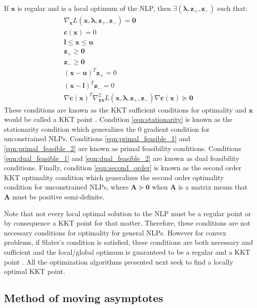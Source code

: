 If $\bm{x}$ is regular and is a local optimum of the NLP, then $\exists (\bm{\lambda}, \bm{z}_+, \bm{z}_-)$ such that:
\begin{align}
  \nabla_{\bm{x}} L(\bm{x}, \bm{\lambda}, \bm{z}_+, \bm{z}_-) = \bm{0} \label{eqn:stationarity} \\
  \bm{c}(\bm{x}) = 0  \label{eqn:primal_feasible_1} \\
  \bm{l} \leq \bm{x} \leq \bm{u}  \label{eqn:primal_feasible_2}  \\
  \bm{z}_+ \geq \bm{0}  \label{eqn:dual_feasible_1}  \\
  \bm{z}_- \geq \bm{0} \label{eqn:dual_feasible_2} \\
  (\bm{x} - \bm{u})^T \bm{z}_+ = 0 \label{eqn:complementarity_1} \\
  (\bm{x} - \bm{l})^T \bm{z}_- = 0 \label{eqn:complementarity_2} \\
  \nabla \bm{c}(\bm{x})^T \nabla_{\bm{x}\bm{x}}^2 L(\bm{x}, \bm{\lambda}, \bm{z}_+, \bm{z}_-) \nabla \bm{c}(\bm{x}) \succcurlyeq \bm{0} \label{eqn:second_order}
\end{align}
These conditions are known as the KKT sufficient conditions for optimality and $\bm{x}$ would be called a KKT point \citep{Boyd2009}. Condition \ref{eqn:stationarity} is known as the stationarity condition which generalizes the 0 gradient condition for unconstrained NLPs. Conditions \ref{eqn:primal_feasible_1} and \ref{eqn:primal_feasible_2} are known as primal feasibility conditions. Conditions \ref{eqn:dual_feasible_1} and \ref{eqn:dual_feasible_2} are known as dual feasibility conditions. Finally, condition \ref{eqn:second_order} is known as the second order KKT optimality condition which generalizes the second order optimality condition for unconstrained NLPs, where $\bm{A} \succcurlyeq \bm{0}$ when $\bm{A}$ is a matrix means that $\bm{A}$ must be positive semi-definite.

Note that not every local optimal solution to the NLP must be a regular point or by consequence a KKT point for that matter. Therefore, these conditions are not necessary conditions for optimality for general NLPs. However for convex problems, if Slater's condition is satisfied, these conditions are both necessary and sufficient and the local/global optimum is guaranteed to be a regular and a KKT point \citep{Boyd2009}. All the optimization algorithms presented next seek to find a locally optimal KKT point.

\subsection{Method of moving asymptotes}

